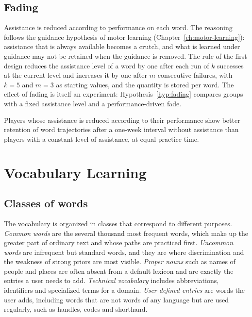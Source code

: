 \section{Fading}

Assistance is reduced according to performance on each word. The reasoning follows the guidance hypothesis of motor learning (Chapter~\ref{ch:motor-learning}): assistance that is always available becomes a crutch, and what is learned under guidance may not be retained when the guidance is removed.\evD{} The rule of the first design reduces the assistance level of a word by one after each run of $k$ successes at the current level and increases it by one after $m$ consecutive failures, with $k=5$ and $m=3$ as starting values, and the quantity is stored per word. The effect of fading is itself an experiment: Hypothesis~\ref{hyp:fading} compares groups with a fixed assistance level and a performance-driven fade.

\begin{hypothesis}\label{hyp:fading}
Players whose assistance is reduced according to their performance show better retention of word trajectories after a one-week interval without assistance than players with a constant level of assistance, at equal practice time.\evH
\end{hypothesis}

\chapter{Vocabulary Learning}\label{ch:vocabulary}

\section{Classes of words}

The vocabulary is organized in classes that correspond to different purposes. \emph{Common words} are the several thousand most frequent words, which make up the greater part of ordinary text and whose paths are practiced first. \emph{Uncommon words} are infrequent but standard words, and they are where discrimination and the weakness of strong priors are most visible. \emph{Proper nouns} such as names of people and places are often absent from a default lexicon and are exactly the entries a user needs to add. \emph{Technical vocabulary} includes abbreviations, identifiers and specialized terms for a domain. \emph{User-defined entries} are words the user adds, including words that are not words of any language but are used regularly, such as handles, codes and shorthand.

